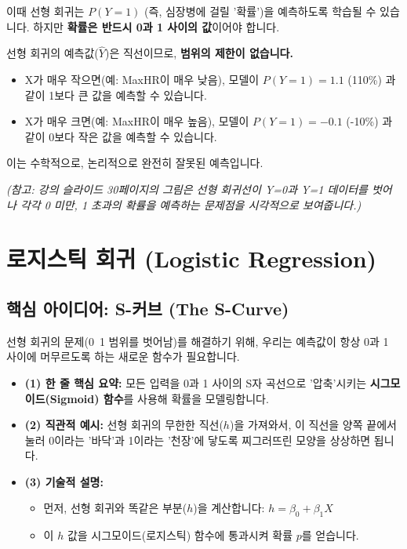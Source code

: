 \documentclass[11pt,a4paper]{book}
\theoremstyle{definition}
\begin{document}
이때 선형 회귀는 $P(Y=1)$ (즉, 심장병에 걸릴 '확률')을 예측하도록 학습될 수 있습니다.
하지만 \textbf{확률은 반드시 0과 1 사이의 값}이어야 합니다.

\begin{warningbox}
선형 회귀의 예측값($\hat{Y}$)은 직선이므로, \textbf{범위의 제한이 없습니다.}
\begin{itemize}
    \item X가 매우 작으면(예: MaxHR이 매우 낮음), 모델이 $P(Y=1) = 1.1$ (110\%) 과 같이 1보다 큰 값을 예측할 수 있습니다.
    \item X가 매우 크면(예: MaxHR이 매우 높음), 모델이 $P(Y=1) = -0.1$ (-10\%) 과 같이 0보다 작은 값을 예측할 수 있습니다.
\end{itemize}
이는 수학적으로, 논리적으로 완전히 잘못된 예측입니다.
\end{warningbox}

\begin{center}
    \textit{(참고: 강의 슬라이드 30페이지의 그림은 선형 회귀선이 Y=0과 Y=1 데이터를 벗어나 각각 0 미만, 1 초과의 확률을 예측하는 문제점을 시각적으로 보여줍니다.)}
\end{center}


\section{로지스틱 회귀 (Logistic Regression)}

\subsection{핵심 아이디어: S-커브 (The S-Curve)}

선형 회귀의 문제(0~1 범위를 벗어남)를 해결하기 위해, 우리는 예측값이 항상 0과 1 사이에 머무르도록 하는 새로운 함수가 필요합니다.

\begin{itemize}
    \item \textbf{(1) 한 줄 핵심 요약:} 모든 입력을 0과 1 사이의 S자 곡선으로 '압축'시키는 \textbf{시그모이드(Sigmoid) 함수}를 사용해 확률을 모델링합니다.
    \item \textbf{(2) 직관적 예시:} 선형 회귀의 무한한 직선($h$)을 가져와서, 이 직선을 양쪽 끝에서 눌러 0이라는 '바닥'과 1이라는 '천장'에 닿도록 찌그러뜨린 모양을 상상하면 됩니다.
    \item \textbf{(3) 기술적 설명:}
        \begin{itemize}
            \item 먼저, 선형 회귀와 똑같은 부분($h$)을 계산합니다: $h = \beta_0 + \beta_1 X$
            \item 이 $h$ 값을 시그모이드(로지스틱) 함수에 통과시켜 확률 $p$를 얻습니다.
        \end{itemize}
\end{itemize}
\end{document}
